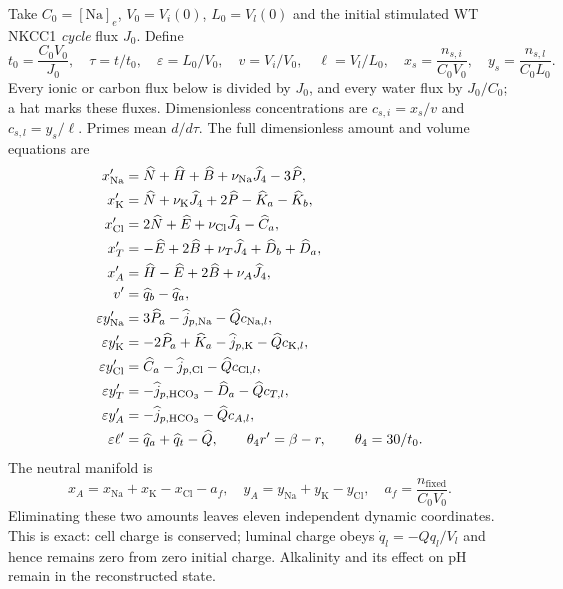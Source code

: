 Take $C_0=[\mathrm{Na}]_e$, $V_0=V_i(0)$, $L_0=V_l(0)$ and the initial
stimulated WT NKCC1 \emph{cycle} flux $J_0$.  Define
\[
 t_0=\frac{C_0V_0}{J_0},\quad \tau=t/t_0,\quad
 \varepsilon=L_0/V_0,\quad v=V_i/V_0,\quad \ell=V_l/L_0,
 \quad x_s=\frac{n_{s,i}}{C_0V_0},\quad y_s=\frac{n_{s,l}}{C_0L_0}.
\]
Every ionic or carbon flux below is divided by $J_0$, and every water flux
by $J_0/C_0$; a hat marks these fluxes.  Dimensionless concentrations are
$c_{s,i}=x_s/v$ and $c_{s,l}=y_s/\ell$.  Primes mean $d/d\tau$.
The full dimensionless amount and volume equations are
\begin{align}
 x_{\mathrm{Na}}'&=\widehat N+\widehat H+\widehat B+
                \nu_{\mathrm{Na}}\widehat J_4-3\widehat P,\notag\\
 x_{\mathrm K}'&=\widehat N+\nu_{\mathrm K}\widehat J_4+
                2\widehat P-\widehat K_a-\widehat K_b,\notag\\
 x_{\mathrm{Cl}}'&=2\widehat N+\widehat E+
                \nu_{\mathrm{Cl}}\widehat J_4-\widehat C_a,\notag\\
 x_T'&=-\widehat E+2\widehat B+\nu_T\widehat J_4+
                \widehat D_b+\widehat D_a,\notag\\
 x_A'&=\widehat H-\widehat E+2\widehat B+\nu_A\widehat J_4,\notag\\
 v'&=\widehat q_b-\widehat q_a,\label{m44eq:dimless-cell}\\
 \varepsilon y_{\mathrm{Na}}'&=3\widehat P_a-\widehat j_{p,\mathrm{Na}}
                -\widehat Q c_{\mathrm{Na},l},\notag\\
 \varepsilon y_{\mathrm K}'&=-2\widehat P_a+\widehat K_a-
                \widehat j_{p,\mathrm K}-\widehat Qc_{\mathrm K,l},\notag\\
 \varepsilon y_{\mathrm{Cl}}'&=\widehat C_a-\widehat j_{p,\mathrm{Cl}}
                -\widehat Qc_{\mathrm{Cl},l},\notag\\
 \varepsilon y_T'&=-\widehat j_{p,\mathrm{HCO}_3}-\widehat D_a-
                \widehat Qc_{T,l},\notag\\
 \varepsilon y_A'&=-\widehat j_{p,\mathrm{HCO}_3}-\widehat Qc_{A,l},\notag\\
 \varepsilon\ell'&=\widehat q_a+\widehat q_t-\widehat Q,
 \qquad \theta_4 r'=\beta-r,\qquad \theta_4=30/t_0.
 \label{m44eq:dimless-lumen}
\end{align}
The neutral manifold is
\begin{equation}
 x_A=x_{\mathrm{Na}}+x_{\mathrm K}-x_{\mathrm{Cl}}-a_f,
 \quad y_A=y_{\mathrm{Na}}+y_{\mathrm K}-y_{\mathrm{Cl}},
 \quad a_f=\frac{n_{\mathrm{fixed}}}{C_0V_0}.
 \label{m44eq:neutral-manifold}
\end{equation}
Eliminating these two amounts leaves eleven independent dynamic
coordinates.  This is exact: cell charge is conserved; luminal charge obeys
$\dot q_l=-Qq_l/V_l$ and hence remains zero from zero initial charge.
Alkalinity and its effect on pH remain in the reconstructed state.

